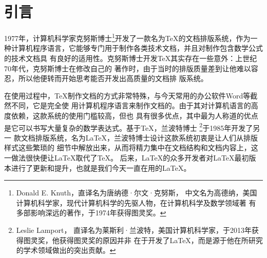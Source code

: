 \chapter*{引言}
1977年，计算机科学家克努斯博士\footnote{Donald E. Knuth，直译名为唐纳德·尔文·克努斯，
    中文名为高德纳，美国计算机科学家，现代计算机科学的先驱人物，在计算机科学及数学领域著
    有多部影响深远的著作，于1974年获得图灵奖。}开发了一款名为TeX的文档排版系统，作为一
种计算机程序语言，它能够专门用于制作各类技术文档，并且对制作包含数学公式的技术文档具
有良好的适用性。克努斯博士开发TeX其实存在一些意外：上世纪70年代，克努斯博士在修改自己的
著作时，由于当时的排版质量差到让他难以容忍，所以他便转而开始思考能否开发出高质量的文档排
版系统。

在使用过程中，TeX制作文档的方式非常特殊，与今天常用的办公软件Word等截然不同，它是完全使
用计算机程序语言来制作文档的。由于其对计算机语言的高度依赖，这款系统的使用门槛较高，但也
具有很多优点，其中最为人称道的优点是它可以书写大量复杂的数学表达式。基于TeX，兰波特博士
\footnote{Leslie Lamport，
    直译名为莱斯利·兰波特，美国计算机科学家，于2013年获得图灵奖，他获得图灵奖的原因并非
    在于开发了LaTeX，而是源于他在所研究的学术领域做出的突出贡献。}于1985年开发了另一
款文档排版系统，名为\LaTeX ，兰波特博士设计这款系统初衷是让人们从排版样式这些繁琐的
细节中解放出来，从而将精力集中在文档结构和文档内容上，这一做法很快便让LaTeX取代了TeX。
后来，LaTeX的众多开发者对LaTeX最初版本进行了更新和提升，也就是我们今天一直在用的LaTeX。